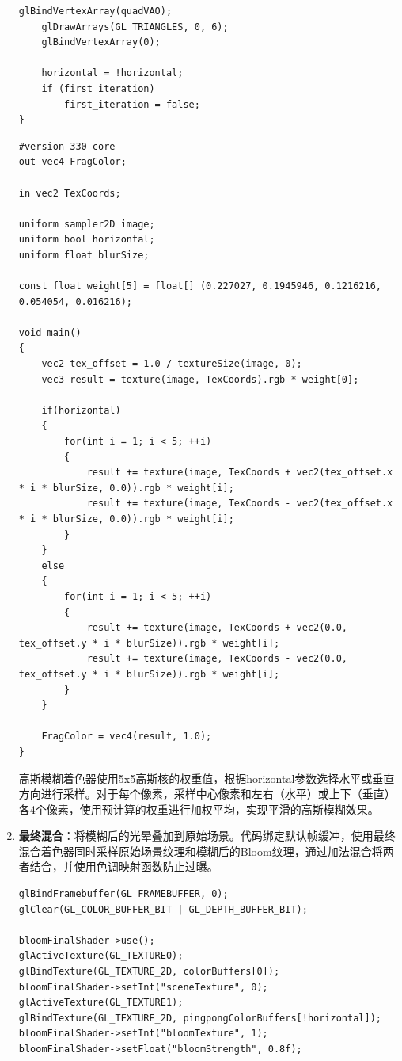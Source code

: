 \documentclass{article}
\begin{document}
\begin{CJK}{UTF8}{gbsn}
\begin{enumerate}
\begin{lstlisting}[caption=高斯模糊Ping-Pong迭代实现]
    glBindVertexArray(quadVAO);
    glDrawArrays(GL_TRIANGLES, 0, 6);
    glBindVertexArray(0);
    
    horizontal = !horizontal;
    if (first_iteration)
        first_iteration = false;
}
    \end{lstlisting}

    \begin{lstlisting}[caption=高斯模糊着色器]
#version 330 core
out vec4 FragColor;

in vec2 TexCoords;

uniform sampler2D image;
uniform bool horizontal;
uniform float blurSize;

const float weight[5] = float[] (0.227027, 0.1945946, 0.1216216, 0.054054, 0.016216);

void main()
{
    vec2 tex_offset = 1.0 / textureSize(image, 0);
    vec3 result = texture(image, TexCoords).rgb * weight[0];
    
    if(horizontal)
    {
        for(int i = 1; i < 5; ++i)
        {
            result += texture(image, TexCoords + vec2(tex_offset.x * i * blurSize, 0.0)).rgb * weight[i];
            result += texture(image, TexCoords - vec2(tex_offset.x * i * blurSize, 0.0)).rgb * weight[i];
        }
    }
    else
    {
        for(int i = 1; i < 5; ++i)
        {
            result += texture(image, TexCoords + vec2(0.0, tex_offset.y * i * blurSize)).rgb * weight[i];
            result += texture(image, TexCoords - vec2(0.0, tex_offset.y * i * blurSize)).rgb * weight[i];
        }
    }
    
    FragColor = vec4(result, 1.0);
}
    \end{lstlisting}

    高斯模糊着色器使用5x5高斯核的权重值，根据horizontal参数选择水平或垂直方向进行采样。对于每个像素，采样中心像素和左右（水平）或上下（垂直）各4个像素，使用预计算的权重进行加权平均，实现平滑的高斯模糊效果。

    \item \textbf{最终混合}：将模糊后的光晕叠加到原始场景。代码绑定默认帧缓冲，使用最终混合着色器同时采样原始场景纹理和模糊后的Bloom纹理，通过加法混合将两者结合，并使用色调映射函数防止过曝。

    \begin{lstlisting}[caption=最终混合实现]
glBindFramebuffer(GL_FRAMEBUFFER, 0);
glClear(GL_COLOR_BUFFER_BIT | GL_DEPTH_BUFFER_BIT);

bloomFinalShader->use();
glActiveTexture(GL_TEXTURE0);
glBindTexture(GL_TEXTURE_2D, colorBuffers[0]);
bloomFinalShader->setInt("sceneTexture", 0);
glActiveTexture(GL_TEXTURE1);
glBindTexture(GL_TEXTURE_2D, pingpongColorBuffers[!horizontal]);
bloomFinalShader->setInt("bloomTexture", 1);
bloomFinalShader->setFloat("bloomStrength", 0.8f);


\end{lstlisting}
\end{enumerate}
\end{CJK}
\end{document}
